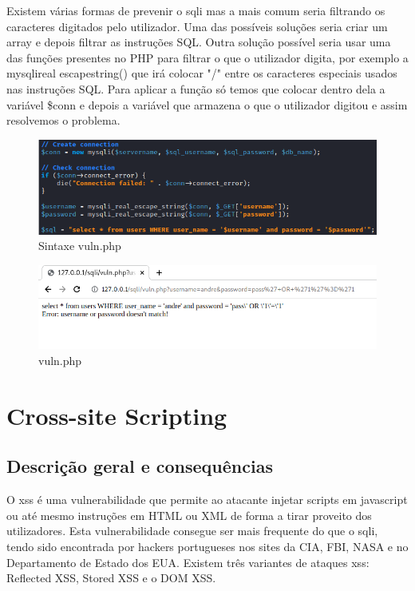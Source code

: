 \documentclass{report}
\begin{document}
Existem várias formas de prevenir o \ac{sqli} mas a mais comum seria filtrando os caracteres digitados pelo utilizador. Uma das possíveis soluções seria criar um array e depois filtrar as instruções SQL. Outra solução possível seria usar uma das funções presentes no PHP para filtrar o que o utilizador digita, por exemplo a mysqli\textreal \textunderscore real \textunderscore escape\textunderscore string() que irá colocar "/" entre os caracteres especiais usados nas instruções SQL. Para aplicar a função só temos que colocar dentro dela a variável \$conn e depois a variável que armazena o que o utilizador digitou e assim resolvemos o problema.

\begin{figure}[h]
 \centering
 \includegraphics[scale=0.5]{imagessqlcode/sqlcode2.png}
 \caption{Sintaxe vuln.php}\label{sintaxe vuln.php}
\end{figure}


\begin{figure}[h]
 \centering
 \includegraphics[scale=0.5]{imagessql/Fig8.png}
 \caption{vuln.php}\label{vuln.php}
\end{figure}  

\clearpage	
\section{Cross-site Scripting}
\subsection{Descrição geral e consequências}

O \ac{xss} é uma vulnerabilidade que permite ao atacante injetar scripts em javascript ou até mesmo instruções em HTML ou XML de forma a tirar proveito dos utilizadores. Esta vulnerabilidade consegue ser mais frequente do que o \ac{sqli}, tendo sido encontrada por hackers portugueses nos sites da CIA, FBI, NASA e no Departamento de Estado dos EUA. Existem três variantes de ataques \ac{xss}: Reflected XSS, Stored XSS e o DOM XSS. 
\end{document}
